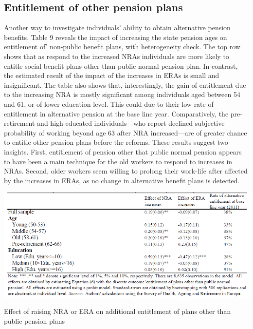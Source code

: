 \documentclass[a4paper]{article}
\begin{document}
\subsection{Entitlement of other pension plans}

Another way to investigate individuals’ ability to obtain alternative pension benefits. Table 9 reveals the impact of increasing the state pension ages on entitlement of’ non-public benefit plans, with heterogeneity check. The top row shows that as respond to the increased NRAs individuals are more likely to entitle social benefit plans other than public normal pension plan. In contrast, the estimated result of the impact of the increases in ERAs is small and insignificant. The table also shows that, interestingly, the gain of entitlement due to the increasing NRA is mostly significant among individuals aged between 54 and 61, or of lower education level. This could due to their low rate of entitlement in alternative pension at the base line year. Comparatively, the pre-retirement and high-educated individuals—who report declined subjective probability of working beyond age 63 after NRA increased—are of greater chance to entitle other pension plans before the reforms. These results suggest two insights. First, entitlement of pension other that public normal pension appears to have been a main technique for the old workers to respond to increases in NRAs. Second, older workers seem willing to prolong their work-life after affected by the increases in ERAs, as no change in alternative benefit plans is detected. 

\begin{table}
    \centering
    \includegraphics[width=0.9\linewidth]{table6.png}
    \caption{Effect of raising NRA or ERA on additional entitlement of plans other than public pension plans}
    \label{6}
\end{table}
\end{document}
